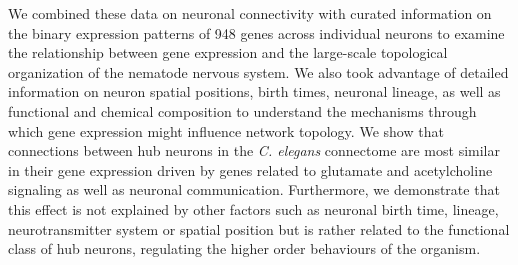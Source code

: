 \documentclass[10pt,letterpaper]{article}
\begin{document}
We combined these data on neuronal connectivity with curated information on the binary expression patterns of 948 genes across individual neurons to examine the relationship between gene expression and the large-scale topological organization of the nematode nervous system.
We also took advantage of detailed information on neuron spatial positions, birth times, neuronal lineage, as well as functional and chemical composition to understand the mechanisms through which gene expression might influence network topology.
We show that connections between hub neurons in the \textit{C. elegans} connectome are most similar in their gene expression driven by genes related to glutamate and acetylcholine signaling as well as neuronal communication. 
Furthermore, we demonstrate that this effect is not explained by other factors such as neuronal birth time, lineage, neurotransmitter system or spatial position but is rather related to the functional class of hub neurons, regulating the higher order behaviours of the organism.


\end{document}

